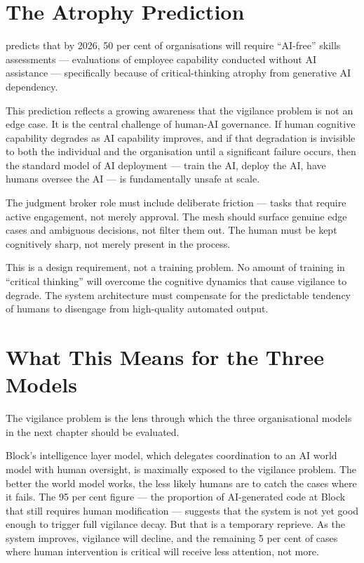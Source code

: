 \section{The Atrophy Prediction}

\textcite{Gartner2025} predicts that by 2026, 50 per cent of organisations will require ``AI-free'' skills assessments --- evaluations of employee capability conducted without AI assistance --- specifically because of critical-thinking atrophy from generative AI dependency.

This prediction reflects a growing awareness that the vigilance problem is not an edge case. It is the central challenge of human-AI governance. If human cognitive capability degrades as AI capability improves, and if that degradation is invisible to both the individual and the organisation until a significant failure occurs, then the standard model of AI deployment --- train the AI, deploy the AI, have humans oversee the AI --- is fundamentally unsafe at scale.

\begin{cautionbox}[title={Design Implication for the Agentic Mesh}]
The judgment broker role must include deliberate friction --- tasks that require active engagement, not merely approval. The mesh should surface genuine edge cases and ambiguous decisions, not filter them out. The human must be kept cognitively sharp, not merely present in the process.

This is a design requirement, not a training problem. No amount of training in ``critical thinking'' will overcome the cognitive dynamics that cause vigilance to degrade. The system architecture must compensate for the predictable tendency of humans to disengage from high-quality automated output.
\end{cautionbox}

\section{What This Means for the Three Models}

The vigilance problem is the lens through which the three organisational models in the next chapter should be evaluated.

Block's intelligence layer model, which delegates coordination to an AI world model with human oversight, is maximally exposed to the vigilance problem. The better the world model works, the less likely humans are to catch the cases where it fails. The 95 per cent figure --- the proportion of AI-generated code at Block that still requires human modification --- suggests that the system is not yet good enough to trigger full vigilance decay. But that is a temporary reprieve. As the system improves, vigilance will decline, and the remaining 5 per cent of cases where human intervention is critical will receive less attention, not more.

